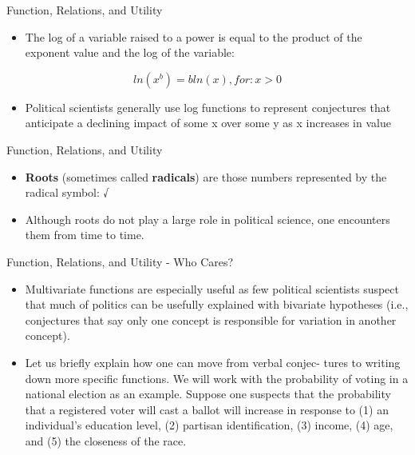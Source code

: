 \documentclass[
  ignorenonframetext,
]{beamer}
\providecommand{\tightlist}{%
  \setlength{\itemsep}{0pt}\setlength{\parskip}{0pt}}
\begin{document}
\begin{frame}{Function, Relations, and Utility}
\protect\hypertarget{function-relations-and-utility-28}{}

\begin{itemize}
\tightlist
\item
  The log of a variable raised to a power is equal to the product of the
  exponent value and the log of the variable:
\end{itemize}

\[ln(x^{b})=bln(x), for: x > 0\]

\begin{itemize}
\tightlist
\item
  Political scientists generally use log functions to represent
  conjectures that anticipate a declining impact of some x over some y
  as x increases in value
\end{itemize}

\end{frame}

\begin{frame}{Function, Relations, and Utility}
\protect\hypertarget{function-relations-and-utility-29}{}

\begin{itemize}
\item
  \textbf{Roots} (sometimes called \textbf{radicals}) are those numbers
  represented by the radical symbol: √
\item
  Although roots do not play a large role in political science, one
  encounters them from time to time.
\end{itemize}

\end{frame}

\begin{frame}{Function, Relations, and Utility - Who Cares?}
\protect\hypertarget{function-relations-and-utility---who-cares}{}

\begin{itemize}
\item
  Multivariate functions are especially useful as few political
  scientists suspect that much of politics can be usefully explained
  with bivariate hypotheses (i.e., conjectures that say only one concept
  is responsible for variation in another concept).
\item
  Let us briefly explain how one can move from verbal conjec- tures to
  writing down more specific functions. We will work with the
  probability of voting in a national election as an example. Suppose
  one suspects that the probability that a registered voter will cast a
  ballot will increase in response to (1) an individual's education
  level, (2) partisan identification, (3) income, (4) age, and (5) the
  closeness of the race.
\end{itemize}

\end{frame}
\end{document}
